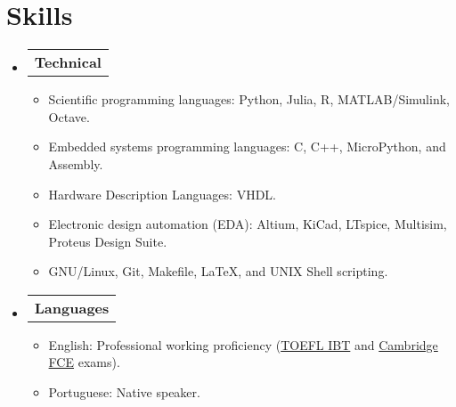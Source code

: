 \section{Skills}

\begin{itemize}[leftmargin=0.15in, label={}] %
  \item   \begin{tabular*}{0.2\textwidth}{l} \textbf{Technical} \end{tabular*}\vspace{-7pt} %
          \begin{itemize} %
            \item Scientific programming languages: Python, Julia, R, MATLAB/Simulink, Octave.
            \item Embedded systems programming languages: C, C++, MicroPython, and Assembly. %
            \item Hardware Description Languages: VHDL.
            \item Electronic design automation (EDA): Altium, KiCad, LTspice, Multisim, Proteus Design Suite.
            \item GNU/Linux, Git, Makefile, \LaTeX, and UNIX Shell scripting.
          \end{itemize}\vspace{-5pt}
  \item   \begin{tabular*}{0.2\textwidth}{l} \textbf{Languages} \end{tabular*}\vspace{-6pt} %
          \begin{itemize}
            \item English: Professional working proficiency (\href{https://github.com/tapyu/tapyu/blob/master/cv/Latex/figs/Toefl.pdf}{TOEFL IBT} and \href{https://github.com/tapyu/tapyu/blob/master/cv/Latex/figs/Cambridge\%20FCE.pdf}{Cambridge FCE} exams).
            \item Portuguese: Native speaker.
          \end{itemize}
\end{itemize} %